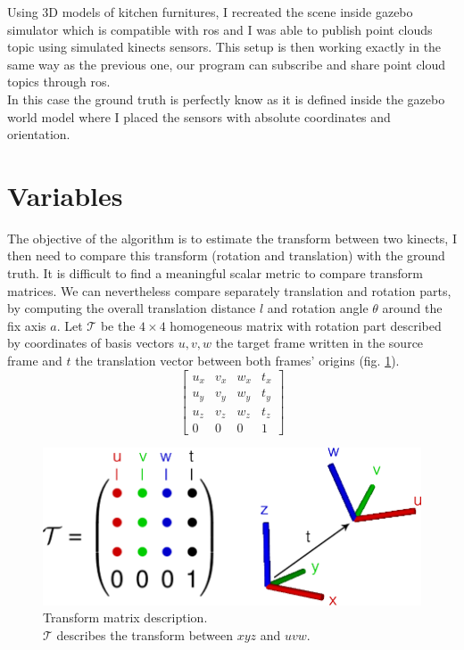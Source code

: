     Using 3D models of kitchen furnitures, I recreated the scene inside gazebo simulator which is compatible with \acrshort{ros} and I was able to publish point clouds topic using simulated kinects sensors. This setup is then working exactly in the same way as the previous one, our program can subscribe and share point cloud topics through \acrshort{ros}. \\
    In this case the ground truth is perfectly know as it is defined inside the gazebo world model where I placed the sensors with absolute coordinates and orientation.

\section{Variables}

    The objective of the algorithm is to estimate the transform between two kinects, I then need to compare this transform (rotation and translation) with the ground truth. It is difficult to find a meaningful scalar metric to compare transform matrices. We can nevertheless compare separately translation and rotation parts, by computing the overall translation distance $l$ and rotation angle $\theta$ around the fix axis $a$.
    Let $\mathcal{T}$ be the $4\times 4$ homogeneous matrix with rotation part described by coordinates of basis vectors $u, v, w$  the target frame written in the source frame and $t$ the translation vector between both frames' origins (fig. \ref{fig:transf}).
    \[
        \begin{bmatrix}
            u_x & v_x & w_x & t_x\\ 
            u_y & v_y & w_y & t_y\\ 
            u_z & v_z & w_z & t_z\\ 
            0 & 0 & 0 & 1
        \end{bmatrix}
    \]
    
    \begin{figure}[h!]
        \centering
        \includegraphics[width=\textwidth]{images/transform.png}
        \caption{Transform matrix description. \\
        $\mathcal{T}$ describes the transform between $xyz$ and $uvw$.}
        \label{fig:transf}
    \end{figure}
    
